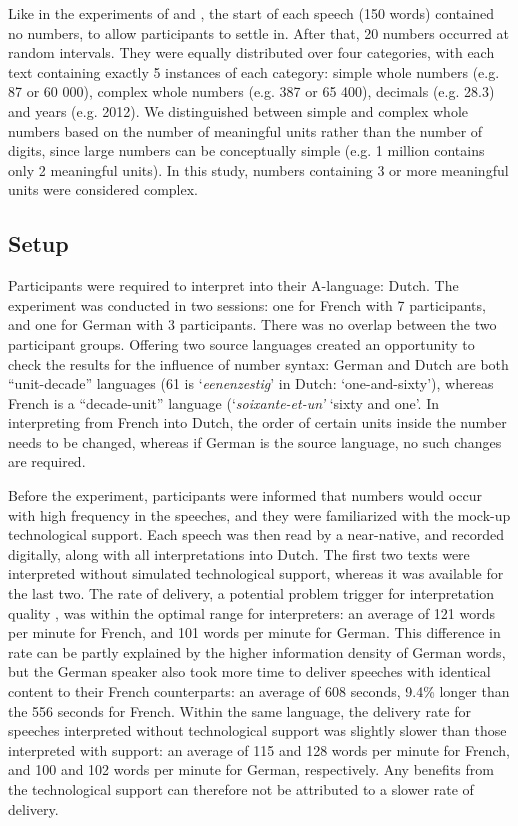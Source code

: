 \documentclass[output=paper]{langsci/langscibook}
\begin{document}
Like in the experiments of \citet{Braun1996} and \citet{Mazza2001}, the start of each speech (150 words) contained no numbers, to allow participants to settle in. After that, 20 numbers occurred at random intervals. They were equally distributed over four categories, with each text containing exactly 5 instances of each category: simple whole numbers (e.g. 87 or 60 000), complex whole numbers (e.g. 387 or 65 400), decimals (e.g. 28.3) and years (e.g. 2012). We distinguished between simple and complex whole numbers based on the number of meaningful units rather than the number of digits, since large numbers can be conceptually simple (e.g. 1 million contains only 2 meaningful units). In this study, numbers containing 3 or more meaningful units were considered complex.

\subsection{Setup}
Participants were required to interpret into their A-language: Dutch. The experiment was conducted in two sessions: one for French with 7 participants, and one for German with 3 participants. There was no overlap between the two participant groups. Offering two source languages created an opportunity to check the results for the influence of number syntax: German and Dutch are both “unit-decade” languages (61 is ‘\textit{eenenzestig}’ in Dutch: ‘one-and-sixty’), whereas French is a “decade-unit” language (‘\textit{soixante-et-un’} ‘sixty and one’. In interpreting from French into Dutch, the order of certain units inside the number needs to be changed, whereas if German is the source language, no such changes are required.

Before the experiment, participants were informed that numbers would occur with high frequency in the speeches, and they were familiarized with the mock-up technological support. Each speech was then read by a near-native, and recorded digitally, along with all interpretations into Dutch. The first two texts were interpreted without simulated technological support, whereas it was available for the last two. The rate of delivery, a potential problem trigger for interpretation quality \citep{Gile1995}, was within the optimal range for interpreters: an average of 121 words per minute for French, and 101 words per minute for German. This difference in rate can be partly explained by the higher information density of German words, but the German speaker also took more time to deliver speeches with identical content to their French counterparts: an average of 608 seconds, 9.4\% longer than the 556 seconds for French. Within the same language, the delivery rate for speeches interpreted without technological support was slightly slower than those interpreted with support: an average of 115 and 128 words per minute for French, and 100 and 102 words per minute for German, respectively. Any benefits from the technological support can therefore not be attributed to a slower rate of delivery.
\end{document}
